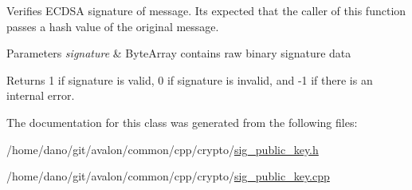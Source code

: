 Verifies E\+C\+D\+SA signature of message. It\textquotesingle{}s expected that the caller of this function passes a hash value of the original message.


\begin{DoxyParams}{Parameters}
{\em signature} & Byte\+Array contains raw binary signature data \\
\hline
\end{DoxyParams}
\begin{DoxyReturn}{Returns}
1 if signature is valid, 0 if signature is invalid, and -\/1 if there is an internal error. 
\end{DoxyReturn}


The documentation for this class was generated from the following files\+:\begin{DoxyCompactItemize}
\item 
/home/dano/git/avalon/common/cpp/crypto/\hyperlink{sig__public__key_8h}{sig\+\_\+public\+\_\+key.\+h}\item 
/home/dano/git/avalon/common/cpp/crypto/\hyperlink{sig__public__key_8cpp}{sig\+\_\+public\+\_\+key.\+cpp}\end{DoxyCompactItemize}
